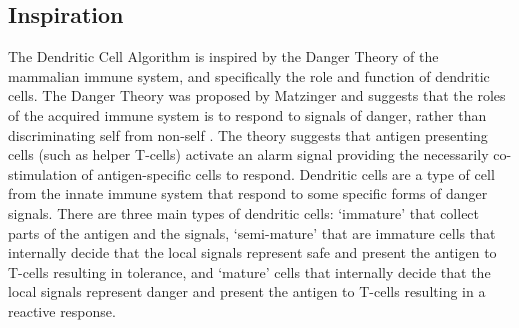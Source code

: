 \subsection{Inspiration}
The Dendritic Cell Algorithm is inspired by the Danger Theory of the mammalian immune system, and specifically the role and function of dendritic cells. 
The Danger Theory was proposed by Matzinger and suggests that the roles of the acquired immune system is to respond to signals of danger, rather than discriminating self from non-self \cite{Matzinger1994, Matzinger2002}. The theory suggests that antigen presenting cells (such as helper T-cells) activate an alarm signal providing the necessarily co-stimulation of antigen-specific cells to respond. Dendritic cells are a type of cell from the innate immune system that respond to some specific forms of danger signals. There are three main types of dendritic cells: `immature' that collect parts of the antigen and the signals, `semi-mature' that are immature cells that internally decide that the local signals represent safe and present the antigen to T-cells resulting in tolerance, and `mature' cells that internally decide that the local signals represent danger and present the antigen to T-cells resulting in a reactive response.


